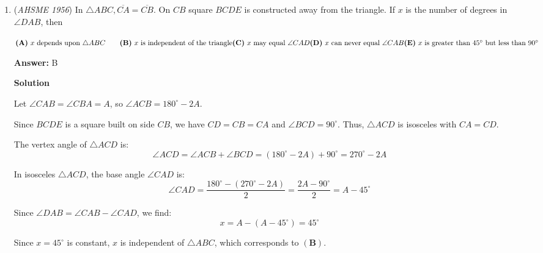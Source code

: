 \begin{enumerate}
 \textbf{Answer: }E



\textbf{Solution}

First, from triangle $ABO$, $\angle AOB = 180^\circ - \angle BAO - \angle ABO$. Note that $AO$ bisects $\angle BAT$ (to see this, draw radii from $O$ to $AB$ and $AT,$ creating two congruent right triangles), so $\angle BAO = \angle BAT/2$. Similarly, $\angle ABO = \angle ABR/2$.

 Also, $\angle BAT = 180^\circ - \angle BAP$, and $\angle ABR = 180^\circ - \angle ABP$. Hence, 

 $\angle AOB = 180^\circ - \angle BAO - \angle ABO =  180^\circ - \frac{\angle BAT}{2} - \frac{\angle ABR}{2} =  180^\circ - \frac{180^\circ - \angle BAP}{2} - \frac{180^\circ - \angle ABP}{2}=   \frac{\angle BAP + \angle ABP}{2}.$

 Finally, from triangle $ABP$, $\angle BAP + \angle ABP = 180^\circ - \angle APB = 180^\circ - 40^\circ = 140^\circ$, so 
 \[\angle AOB = \frac{\angle BAP + \angle ABP}{2} = \frac{140^\circ}{2} = \boxed{70^\circ}.\]



	\item (\textit{AHSME 1956}) In $\triangle ABC, \overline{CA} = \overline{CB}$. On $CB$ square $BCDE$ is constructed away from the triangle. 
If $x$ is the number of degrees in $\angle DAB$, then 


 $\textbf{(A)}\ x\text{ depends upon }\triangle ABC \qquad \textbf{(B)}\ x\text{ is independent of the triangle} \\ \textbf{(C)}\ x\text{ may equal }\angle CAD \qquad \\ \textbf{(D)}\ x\text{ can never equal }\angle CAB \\ \textbf{(E)}\ x\text{ is greater than }45^{\circ}\text{ but less than }90^{\circ}$

 \textbf{Answer: }B



\textbf{Solution}

Let $\angle CAB = \angle CBA = A$, so $\angle ACB = 180^\circ - 2A$.

 Since $BCDE$ is a square built on side $CB$, we have $CD = CB = CA$ and $\angle BCD = 90^\circ$. Thus, $\triangle ACD$ is isosceles with $CA = CD$.

 The vertex angle of $\triangle ACD$ is:
 \[\angle ACD = \angle ACB + \angle BCD = (180^\circ - 2A) + 90^\circ = 270^\circ - 2A\]

 In isosceles $\triangle ACD$, the base angle $\angle CAD$ is:
 \[\angle CAD = \frac{180^\circ - (270^\circ - 2A)}{2} = \frac{2A - 90^\circ}{2} = A - 45^\circ\]

 Since $\angle DAB = \angle CAB - \angle CAD$, we find:
 \[x = A - (A - 45^\circ) = 45^\circ\]

 Since $x = 45^\circ$ is constant, $x$ is independent of $\triangle ABC$, which corresponds to $\mathbf{(B)}$.

 


\end{enumerate}